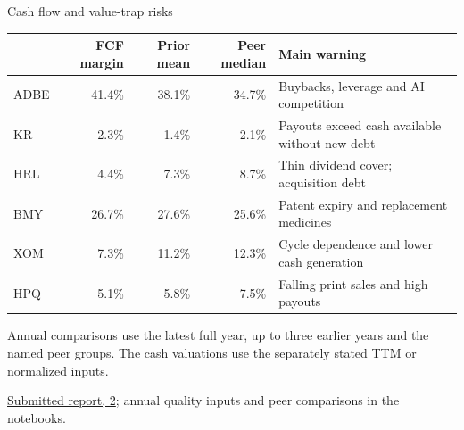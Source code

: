\documentclass[aspectratio=169,11pt,t]{beamer}
\newcommand{\source}[1]{\par\vfill{\fontsize{6.3}{8}\selectfont\color{muted}#1\par}}
\newcommand{\reportsection}[1]{\href{https://kybeka.github.io/meridian-capital/materials/round-2-report.pdf}{Submitted report, #1}}
\newcommand{\tablefont}{\fontsize{9}{11.5}\selectfont}
\begin{document}
\begin{frame}{Cash flow and value-trap risks}

\tablefont\begin{tabularx}{\textwidth}{@{}lrrrX@{}}\toprule
 & FCF margin & Prior mean & Peer median & Main warning\\\midrule
ADBE & 41.4\% & 38.1\% & 34.7\% & Buybacks, leverage and AI competition\\
KR & 2.3\% & 1.4\% & 2.1\% & Payouts exceed cash available without new debt\\
HRL & 4.4\% & 7.3\% & 8.7\% & Thin dividend cover; acquisition debt\\
BMY & 26.7\% & 27.6\% & 25.6\% & Patent expiry and replacement medicines\\
XOM & 7.3\% & 11.2\% & 12.3\% & Cycle dependence and lower cash generation\\
HPQ & 5.1\% & 5.8\% & 7.5\% & Falling print sales and high payouts\\\bottomrule
\end{tabularx}\par\vspace{.20cm}
\small Annual comparisons use the latest full year, up to three earlier years and the named peer groups. The cash valuations use the separately stated TTM or normalized inputs.
\source{\reportsection{2}; annual quality inputs and peer comparisons in the notebooks.}

\end{frame}
\end{document}
